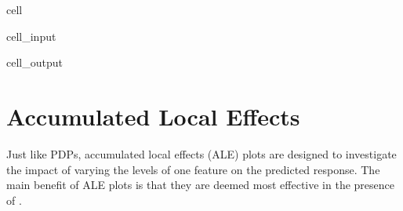 \documentclass[letterpaper,10pt,english]{jupyterBook}
\begin{document}
\begin{sphinxuseclass}{cell}
\begin{sphinxVerbatimInput}
\begin{sphinxuseclass}{cell_input}
\begin{sphinxVerbatim}[commandchars=\\\{\}]
  \PYG{p}{[}\PYG{p}{]}    
 \PYG{p}{[}\PYG{p}{]}
\PYG{p}{[}\PYG{p}{]} 
\PYG{p}{[}\PYG{p}{]} 
\PYG{p}{[}\PYG{p}{]}  

\end{sphinxVerbatim}

\end{sphinxuseclass}\end{sphinxVerbatimInput}
\begin{sphinxVerbatimOutput}

\begin{sphinxuseclass}{cell_output}
\noindent{}

\end{sphinxuseclass}\end{sphinxVerbatimOutput}

\end{sphinxuseclass}
\sphinxstepscope


\chapter{Accumulated Local Effects}
\label{\detokenize{notebooks/accumulated_local_effects:accumulated-local-effects}}\label{\detokenize{notebooks/accumulated_local_effects::doc}}
\sphinxAtStartPar
Just like PDPs, accumulated local effects (ALE) plots are designed to investigate the impact of varying the levels of one feature on the predicted response. The main benefit of ALE plots is that they are deemed most effective in the presence of .
\end{document}
